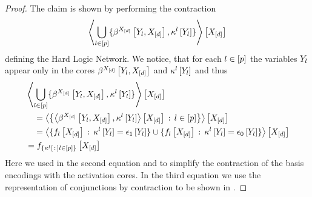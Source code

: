 \begin{proof}
	The claim is shown by performing the contraction
	\begin{align*}
		\left\langle 
			\bigcup_{l\in[p]}\{\beta^{X_{[d]}}\left[Y_{l},X_{[d]}\right],\kappa^{l}\left[Y_{l}\right]\}
		\right\rangle \left[ X_{[d]} \right]
	\end{align*}
	defining the Hard Logic Network.
	We notice, that for each $l\in[p]$ the variables $Y_{l}$ appear only in the cores $\beta^{X_{[d]}}\left[Y_{l},X_{[d]}\right]$ and $\kappa^{l}\left[Y_{l}\right]$ and thus
	\begin{align*}
		& \left\langle 
			\bigcup_{l\in[p]}\{\beta^{X_{[d]}}\left[Y_{l},X_{[d]}\right],\kappa^{l}\left[Y_{l}\right]\}
		\right\rangle \left[ X_{[d]} \right] \\
		& \quad = 	\left\langle 
			\left\{
			\left\langle \beta^{X_{[d]}}\left[Y_{l},X_{[d]}\right],\kappa^{l}\left[Y_{l}\right]\right\rangle \left[ X_{[d]} \right]
			\,:\,l\in[p]\right\}
		\right\rangle \left[ X_{[d]} \right] \\
		& \quad = \left\langle 
			\{
			f_{l}\left[X_{[d]}\right]
			\,:\,\kappa^{l}\left[Y_{l}\right] = \epsilon_1\left[Y_{l}\right]
			\}
			\cup
			\{
			f_{l}\left[X_{[d]}\right]
			\,:\,\kappa^{l}\left[Y_{l}\right] = \epsilon_0\left[Y_{l}\right]
			\}
		\right\rangle \left[ X_{[d]} \right] \\
		& = f_{\{\kappa^{l}\left[\,:\,\right]l\in[p]\}}\left[X_{[d]}\right]
	\end{align*}
	Here we used in the second equation  and  to simplify the contraction of the basis encodings with the activation cores.
	In the third equation we use the representation of conjunctions by contraction to be shown in .
\end{proof}

